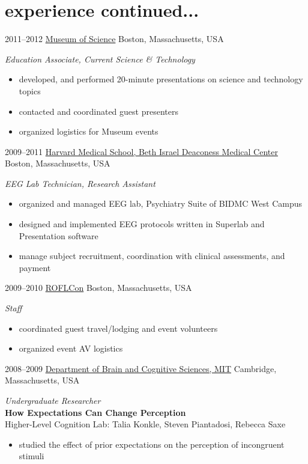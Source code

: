 \documentclass[]{friggeri-cv}
\begin{document}
\section{experience continued...}
\begin{entrylist}
  \entry
	{2011--2012}
	{\href{http://www.mos.org/}{Museum of Science}}
	{Boston, Massachusetts, USA}
	{\emph{Education Associate, Current Science \& Technology}
	\begin{itemize}
		\item developed, and performed 20-minute presentations on science and technology topics
		\item contacted and coordinated guest presenters
		\item organized logistics for Museum events
	\end{itemize}
	}
  \entry
	{2009--2011}
	{\href{http://www.bidmc.org/}{Harvard Medical School, Beth Israel Deaconess Medical Center}}
	{Boston, Massachusetts, USA}
	{\emph{EEG Lab Technician, Research Assistant}
	\begin{itemize}
		\item organized and managed EEG lab, Psychiatry Suite of BIDMC West Campus
		\item designed and implemented EEG protocols written in Superlab and Presentation software 
		\item manage subject recruitment, coordination with clinical assessments, and payment
	\end{itemize}
	}
  \entry
	{2009--2010}
	{\href{https://twitter.com/roflcon}{ROFLCon}}
	{Boston, Massachusetts, USA}
	{\emph{Staff}
	\begin{itemize}
		\item coordinated guest travel/lodging and event volunteers
		\item organized event AV logistics
	\end{itemize}
	}
  \entry
	{2008--2009}
	{\href{http://bcs.mit.edu/}{Department of Brain and Cognitive Sciences, MIT}}
	{Cambridge, Massachusetts, USA}
	{\emph{Undergraduate Researcher} \\
	\textbf{How Expectations Can Change Perception} \\
	Higher-Level Cognition Lab: Talia Konkle, Steven Piantadosi, Rebecca Saxe
	\begin{itemize}
		\item studied the effect of prior expectations on the perception of incongruent stimuli

\end{itemize}}
\end{entrylist}
\end{document}
